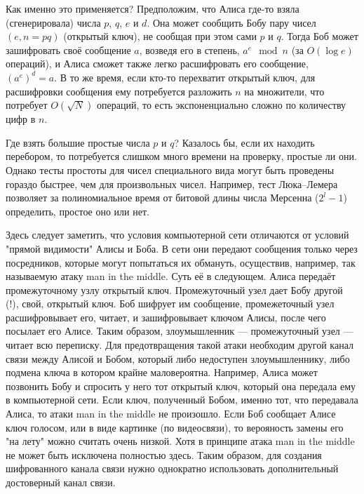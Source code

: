 \documentclass{book}
\begin{document}
Как именно это применяется? Предположим, что Алиса где-то взяла (сгенерировала) числа $p$, $q$, $e$
и $d$. Она может сообщить Бобу пару чисел $(e, n = pq)$ (открытый ключ), не сообщая при этом сами
$p$ и $q$. Тогда Боб может зашифровать своё сообщение $a$, возведя его в степень, $a^e \mod n$ (за
$O(\log e)$ операций), и Алиса сможет также легко расшифровать его сообщение, $(a^e)^d = a$. В то
же время, если кто-то перехватит открытый ключ, для расшифровки сообщения ему потребуется разложить
$n$ на множители, что потребует $O(\sqrt{N})$ операций, то есть экспоненциально сложно по
количеству цифр в $n$.

Где взять большие простые числа $p$ и $q$? Казалось бы, если их находить перебором, то потребуется
слишком много времени на проверку, простые ли они. Однако тесты простоты для чисел
специального вида могут быть проведены гораздо быстрее, чем для произвольных чисел. Например, тест
Люка--Лемера позволяет за полиномиальное время от битовой длины числа Мерсенна ($2^l - 1$)
определить, простое оно или нет.

Здесь следует заметить, что условия компьютерной сети отличаются от условий "прямой видимости"
Алисы и Боба. В сети они передают сообщения только через посредников, которые могут попытаться их
обмануть, осуществив, например, так называемую атаку man in the middle. Суть её в следующем. Алиса
передаёт промежуточному узлу открытый ключ. Промежуточный узел дает Бобу другой (!), свой, открытый
ключ. Боб шифрует им сообщение, промежеточный узел расшифровывает его, читает, и зашифровывает
ключом Алисы, после чего посылает его Алисе. Таким образом, злоумышленник --- промежуточный узел
--- читает всю переписку. Для предотвращения такой атаки необходим другой канал связи между Алисой
и Бобом, который либо недоступен злоумышленнику, либо подмена ключа в котором крайне маловероятна.
Например, Алиса может позвонить Бобу и спросить у него тот открытый ключ, который она передала ему
в компьютерной сети. Если ключ, полученный Бобом, именно тот, что передавала Алиса, то атаки man in
the middle не произошло. Если Боб сообщает Алисе ключ голосом, или в виде картинке (по видеосвязи),
то верояность замены его "на лету" можно считать очень низкой. Хотя в принципе атака man in the
middle не может быть исключена полностью здесь. Таким образом, для создания шифрованного канала
связи нужно однократно использовать дополнительный достоверный канал связи.
\end{document}
